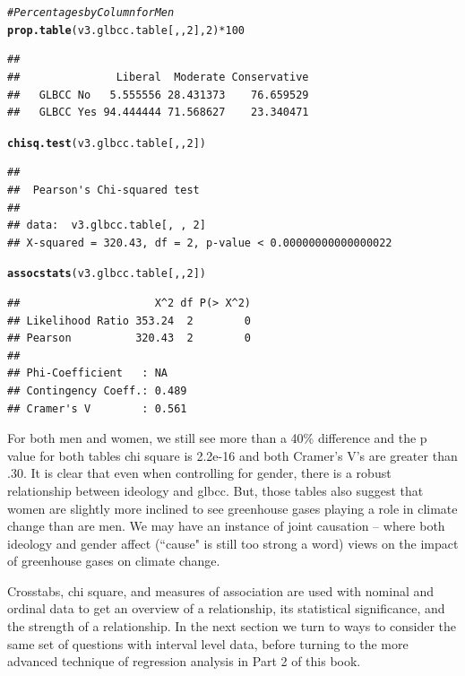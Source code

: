 \documentclass[11pt,openany]{book}\usepackage[]{graphicx}\usepackage[]{color}
\makeatletter
\newcommand{\hlnum}[1]{\textcolor[rgb]{0.686,0.059,0.569}{#1}}%
\newcommand{\hlcom}[1]{\textcolor[rgb]{0.678,0.584,0.686}{\textit{#1}}}%
\newcommand{\hlopt}[1]{\textcolor[rgb]{0,0,0}{#1}}%
\newcommand{\hlstd}[1]{\textcolor[rgb]{0.345,0.345,0.345}{#1}}%
\newcommand{\hlkwd}[1]{\textcolor[rgb]{0.737,0.353,0.396}{\textbf{#1}}}%
\newenvironment{kframe}{%
 \def\at@end@of@kframe{}%
 \ifinner\ifhmode%
  \def\at@end@of@kframe{\end{minipage}}%
  \begin{minipage}{\columnwidth}%
 \fi\fi%
 \def\FrameCommand##1{\hskip\@totalleftmargin \hskip-\fboxsep
 \colorbox{shadecolor}{##1}\hskip-\fboxsep
     \hskip-\linewidth \hskip-\@totalleftmargin \hskip\columnwidth}%
 \MakeFramed {\advance\hsize-\width
   \@totalleftmargin\z@ \linewidth\hsize
   \@setminipage}}%
 {\par\unskip\endMakeFramed%
 \at@end@of@kframe}
\newenvironment{knitrout}{}{} %
\renewenvironment{knitrout}{\begin{singlespace}}{\end{singlespace}}
\makeatother
\begin{document}
\begin{knitrout}
\color{fgcolor}\begin{kframe}
\begin{alltt}
\hlcom{# Percentages by Column for Men}
\hlkwd{prop.table}\hlstd{(v3.glbcc.table[, ,} \hlnum{2}\hlstd{],} \hlnum{2}\hlstd{)} \hlopt{*} \hlnum{100}
\end{alltt}
\begin{verbatim}
##            
##               Liberal  Moderate Conservative
##   GLBCC No   5.555556 28.431373    76.659529
##   GLBCC Yes 94.444444 71.568627    23.340471
\end{verbatim}
\begin{alltt}
\hlkwd{chisq.test}\hlstd{(v3.glbcc.table[, ,} \hlnum{2}\hlstd{])}
\end{alltt}
\begin{verbatim}
## 
## 	Pearson's Chi-squared test
## 
## data:  v3.glbcc.table[, , 2]
## X-squared = 320.43, df = 2, p-value < 0.00000000000000022
\end{verbatim}
\begin{alltt}
\hlkwd{assocstats}\hlstd{(v3.glbcc.table[, ,} \hlnum{2}\hlstd{])}
\end{alltt}
\begin{verbatim}
##                     X^2 df P(> X^2)
## Likelihood Ratio 353.24  2        0
## Pearson          320.43  2        0
## 
## Phi-Coefficient   : NA 
## Contingency Coeff.: 0.489 
## Cramer's V        : 0.561
\end{verbatim}
\end{kframe}
\end{knitrout}

For both men and women, we still see more than a 40\% difference and the p value for both tables chi square is 2.2e-16 and both Cramer's V's are greater than .30.  It is clear that even when controlling for gender, there is a robust relationship between ideology and glbcc.  But, those tables also suggest that women are slightly more inclined to see greenhouse gases playing a role in climate change than are men.   We may have an instance of joint causation -- where both ideology and gender affect (``cause" is still too strong a word) views on the impact of greenhouse gases on climate change.

Crosstabs, chi square, and measures of association are used with nominal and ordinal data to get an overview of a relationship, its statistical significance, and the strength of a relationship.  In the next section we turn to ways to consider the same set of questions with interval level data, before turning to the more advanced technique of regression analysis in Part 2 of this book.  
\end{document}
